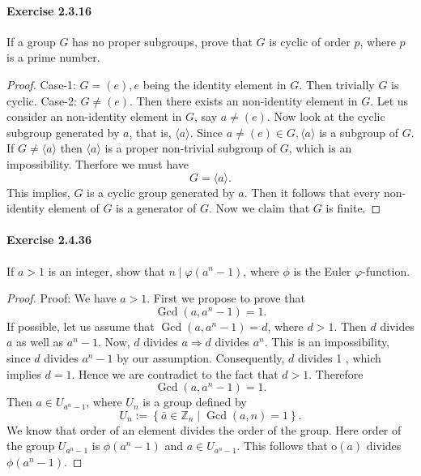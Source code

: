 \documentclass{article}
\begin{document}
\paragraph{Exercise 2.3.16} If a group $G$ has no proper subgroups, prove that $G$ is cyclic of order $p$, where $p$ is a prime number.
\begin{proof}
    Case-1: $G=(e), e$ being the identity element in $G$. Then trivially $G$ is cyclic.
    Case-2: $G \neq(e)$. Then there exists an non-identity element in $G.$ Let us consider an non-identity element in $G$, say $a\neq (e)$. Now look at the cyclic subgroup generated by $a$, that is, $\langle a\rangle$. Since
    $a\neq (e) \in G,\langle a\rangle$ is a subgroup of $G$.
If $G \neq\langle a\rangle$ then $\langle a\rangle$ is a proper non-trivial subgroup of $G$, which is an impossibility. Therfore we must have
$$
G=\langle a\rangle .
$$
This implies, $G$ is a cyclic group generated by $a$. Then it follows that every non-identity element of $G$ is a generator of $G$. Now we claim that $G$ is finite.
\end{proof}



\paragraph{Exercise 2.4.36} If $a > 1$ is an integer, show that $n \mid \varphi(a^n - 1)$, where $\phi$ is the Euler $\varphi$-function.
\begin{proof}
    Proof: We have $a>1$. First we propose to prove that
$$
\operatorname{Gcd}\left(a, a^n-1\right)=1 .
$$
If possible, let us assume that
$\operatorname{Gcd}\left(a, a^n-1\right)=d$, where $d>1$.
Then
$d$ divides $a$ as well as $a^n-1$.
Now,
$d$ divides $a \Longrightarrow d$ divides $a^n$.
This is an impossibility, since $d$ divides $a^n-1$ by our assumption. Consequently, $d$ divides 1 , which implies $d=1$. Hence we are contradict to the fact that $d>1$. Therefore
$$
\operatorname{Gcd}\left(a, a^n-1\right)=1 .
$$
Then $a \in U_{a^n-1}$, where $U_n$ is a group defined by
$$
U_n:=\left\{\bar{a} \in \mathbb{Z}_n \mid \operatorname{Gcd}(a, n)=1\right\} .
$$
We know that order of an element divides the order of the group. Here order of the group $U_{a^n-1}$ is $\phi\left(a^n-1\right)$ and $a \in U_{a^n-1}$. This follows that $\mathrm{o}(a)$ divides $\phi\left(a^n-1\right)$.
\end{proof}
\end{document}
